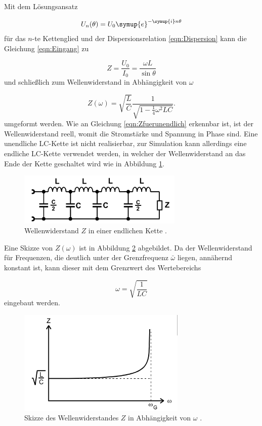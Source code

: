 Mit dem Lösungsansatz

\begin{equation}
  U_n(\theta) = U_0 \symup{e}^{-\symup{i}n\theta}
\end{equation}
für das $n$-te Kettenglied und der Dispersionsrelation \eqref{eqn:Dispersion}
kann die Gleichung \eqref{eqn:Eingang} zu

\begin{equation}
  Z = \frac{U_0}{I_0} = \frac{\omega L}{\sin \theta}
\end{equation}
und schließlich zum Wellenwiderstand in Abhängigkeit von $\omega$

\begin{equation}
  Z(\omega) = \sqrt{\frac{L}{C}} \frac{1}{\sqrt{1-\frac{1}{4}\omega^2 LC}}.
  \label{eqn:Zfuerunendlich}
\end{equation}
umgeformt werden.
Wie an Gleichung \eqref{eqn:Zfuerunendlich} erkennbar ist, ist der
Wellenwiderstand reell, womit die Stromstärke und Spannung in Phase sind.
Eine unendliche LC-Kette ist nicht realisierbar, zur Simulation kann
allerdings eine endliche LC-Kette verwendet werden, in welcher der
Wellenwiderstand an das Ende der Kette geschaltet wird wie in Abbildung
\ref{fig:endK}.

\begin{figure}
  \centering
  \includegraphics[height = 2.5cm]{endlicheWelle.png}
  \caption{Wellenwiderstand $Z$ in einer endlichen Kette \cite{anleitung}.}
  \label{fig:endK}
\end{figure}

Eine Skizze von $Z(\omega)$ ist in Abbildung \ref{fig:WO} abgebildet. Da der
Wellenwiderstand für Frequenzen, die deutlich unter der Grenzfrequenz
$\bar{\omega}$ liegen, annähernd konstant ist, kann dieser mit dem Grenzwert
des Wertebereichs

\begin{equation}
  \omega = \sqrt{\frac{1}{LC}}
\end{equation}
eingebaut werden.

\begin{figure}
  \centering
  \includegraphics[height = 5cm]{WiderstandOmega.png}
  \caption{Skizze des Wellenwiderstandes $Z$ in Abhängigkeit von $\omega$
  \cite{anleitung}.}
  \label{fig:WO}
\end{figure}


